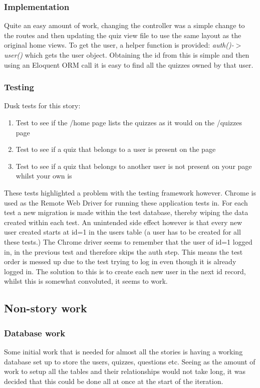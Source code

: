 \subsubsection{Implementation}
Quite an easy amount of work, changing the controller was a simple change to the routes and then updating the quiz view file to use the same layout as the original home views. To get the user, a helper function is provided: \textit{auth()-$>$user()} which gets the user object. Obtaining the id from this is simple and then using an Eloquent ORM call it is easy to find all the quizzes owned by that user.
\subsubsection{Testing}
Dusk tests for this story:
\begin{enumerate}
	\item Test to see if the /home page lists the quizzes as it would on the /quizzes page
	\item Test to see if a quiz that belongs to a user is present on the page
	\item Test to see if a quiz that belongs to another user is not present on your page whilst your own is
\end{enumerate}
These tests highlighted a problem with the testing framework however. Chrome is used as the Remote Web Driver for running these application tests in. For each test a new migration is made within the test database, thereby wiping the data created within each test. An unintended side effect however is that every new user created starts at id=1 in the users table (a user has to be created for all these tests.) The Chrome driver seems to remember that the user of id=1 logged in, in the previous test and therefore skips the auth step. This means the test order is messed up due to the test trying to log in even though it is already logged in. The solution to this is to create each new user in the next id record, whilst this is somewhat convoluted, it seems to work.
\newpage

\subsection{Non-story work}
\subsubsection{Database work}
Some initial work that is needed for almost all the stories is having a working database set up to store the users, quizzes, questions etc. Seeing as the amount of work to setup all the tables and their relationships would not take long, it was decided that this could be done all at once at the start of the iteration.

